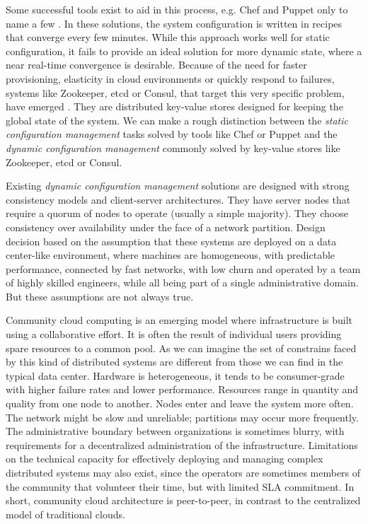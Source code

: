 \documentclass{sig-alternate}
\begin{document}
Some successful tools exist to aid in this process, e.g. Chef and Puppet only to name a few \cite{delaet2010survey}. In these solutions, the system configuration is written in recipes that converge every few minutes. While this approach works well for static configuration, it fails to provide an ideal solution for more dynamic state, where a near real-time convergence is desirable. Because of the need for faster provisioning, elasticity in cloud environments or quickly respond to failures, systems like Zookeeper, etcd or Consul, that target this very specific problem, have emerged \cite{lev2016modular}. They are distributed key-value stores designed for keeping the global state of the system. We can make a rough distinction between the \textit{static configuration management} tasks solved by tools like Chef or Puppet and the \textit{dynamic configuration management} commonly solved by key-value stores like Zookeeper, etcd or Consul.

Existing \textit{dynamic configuration management} solutions are designed with strong consistency models and client-server architectures. They have server nodes that require a quorum of nodes to operate (usually a simple majority). They choose consistency over availability under the face of a network partition. Design decision based on the assumption that these systems are deployed on a data center-like environment, where machines are homogeneous, with predictable performance, connected by fast networks, with low churn and operated by a team of highly skilled engineers, while all being part of a single administrative domain. But these assumptions are not always true.

Community cloud computing\cite{marinos2009community} is an emerging model where infrastructure is built using a collaborative effort. It is often the result of individual users providing spare resources to a common pool. As we can imagine the set of constrains faced by this kind of distributed systems are different from those we can find in the typical data center. Hardware is heterogeneous, it tends to be consumer-grade with higher failure rates and lower performance. Resources range in quantity and quality from one node to another. Nodes enter and leave the system more often. The network might be slow and unreliable; partitions may occur more frequently. The administrative boundary between organizations is sometimes blurry, with requirements for a decentralized administration of the infrastructure. Limitations on the technical capacity for effectively deploying and managing complex distributed systems may also exist, since the operators are sometimes members of the community that volunteer their time, but with limited SLA commitment. In short, community cloud architecture is peer-to-peer\cite{babaoglupeer, ranjan2010peer}, in contrast to the centralized model of traditional clouds.
\end{document}

